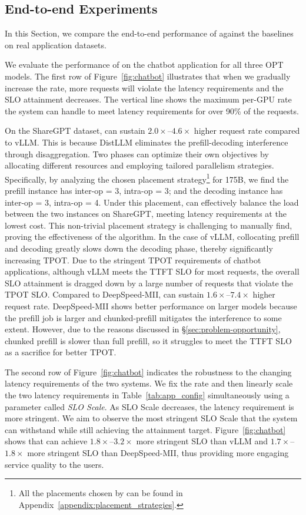 \subsection{End-to-end Experiments}
\label{exp:end_to_end}
In this Section, we compare the end-to-end performance of \sys against the baselines on real application datasets.

 We evaluate the performance of \sys on the chatbot application for all three OPT models. The first row of Figure~\ref{fig:chatbot} illustrates that when we gradually increase the rate, more requests will violate the latency requirements and the SLO attainment decreases. The vertical line shows the maximum per-GPU rate the system can handle to meet latency requirements for over 90\% of the requests.

On the ShareGPT dataset, \sys can sustain $2.0\times$--$4.6\times$ higher request rate compared to vLLM. This is because DistLLM eliminates the prefill-decoding interference through disaggregation. Two phases can optimize their own objectives by allocating different resources and employing tailored parallelism strategies. Specifically, by analyzing the chosen placement strategy\footnote{All the placements chosen by \sys can be found in Appendix~\ref{appendix:placement_strategies}.} for 175B, we find the prefill instance has inter-op = 3, intra-op = 3; and the decoding instance has inter-op = 3, intra-op = 4. Under this placement, \sys can effectively balance the load between the two instances on ShareGPT, meeting latency requirements at the lowest cost. This non-trivial placement strategy is challenging to manually find, proving the effectiveness of the algorithm. In the case of vLLM, collocating prefill and decoding greatly slows down the decoding phase, thereby significantly increasing TPOT. Due to the stringent TPOT requirements of chatbot applications, although vLLM meets the TTFT SLO for most requests, the overall SLO attainment is dragged down by a large number of requests that violate the TPOT SLO. Compared to DeepSpeed-MII, \sys can sustain $1.6\times$--$7.4\times$ higher request rate. DeepSpeed-MII shows better performance on larger models because the prefill job is larger and chunked-prefill mitigates the interference to some extent. However, due to the reasons discussed in \S\ref{sec:problem-opportunity}, chunked prefill is slower than full prefill, so it struggles to meet the TTFT SLO as a sacrifice for better TPOT.

The second row of Figure~\ref{fig:chatbot} indicates the robustness to the changing latency requirements of the two systems. We fix the rate and then linearly scale the two latency requirements in Table~\ref{tab:app_config} simultaneously using a parameter called \textit{SLO Scale}. As SLO Scale decreases, the latency requirement is more stringent. We aim to observe the most stringent SLO Scale that the system can withstand while still achieving the attainment target. Figure~\ref{fig:chatbot} shows that \sys can achieve $1.8\times$--$3.2\times$ more stringent SLO than vLLM and $1.7\times$--$1.8\times$ more stringent SLO than DeepSpeed-MII, thus providing more engaging service quality to the users.

